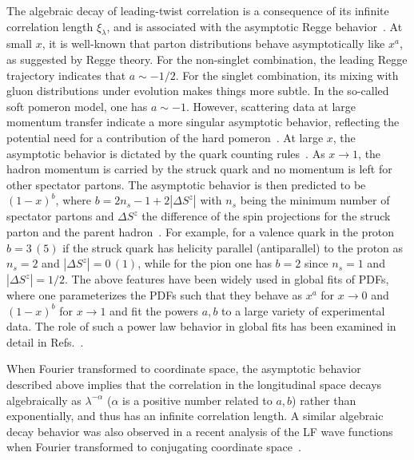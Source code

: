 \documentclass[preprint,12pt]{elsarticle}
\begin{document}
The algebraic decay of leading-twist correlation is a consequence of its infinite correlation length $\xi_\lambda$, and is associated with the asymptotic Regge behavior~\cite{Regge:1959mz}. At small $x$, it is well-known that parton distributions behave asymptotically like $x^a$, as suggested by Regge theory. For the non-singlet combination, the leading Regge trajectory indicates that $a\sim-1/2$. For the singlet combination, its mixing with gluon distributions under evolution makes things more subtle. In the so-called soft pomeron model, one has $a\sim -1$. However, scattering data at large momentum transfer indicate a more singular asymptotic behavior, reflecting the potential need for a contribution of the hard pomeron~\cite{Devenish:2004pb}. At large $x$, the asymptotic behavior is dictated by the quark counting rules~\cite{Brodsky:1973kr}. As $x\to 1$, the hadron momentum is carried by the struck quark and no momentum is left for other spectator partons. The asymptotic behavior is then predicted to be $(1-x)^b$, where $b=2n_s-1+2|\Delta S^z|$ with $n_s$ being the minimum number of spectator partons and $\Delta S^z$ the difference of the spin projections for the struck parton and the parent hadron~\cite{Devenish:2004pb,Brodsky:2005wx}. For example, for a valence quark in the proton $b=3\, (5)$ if the struck quark has helicity parallel (antiparallel) to the proton as $n_s=2$ and $|\Delta S^z|= 0\, (1)$, while for the pion one has $b=2$ since $n_s=1$ and $|\Delta S^z|=1/2$. The above features have been widely used in global fits of PDFs, where one parameterizes the PDFs such that they behave as $x^a$ for $x\to 0$ and $(1-x)^b$ for $x\to 1$ and fit the powers $a, b$ to a large variety of experimental data.
The role of such a power law behavior in global fits has been examined in detail in Refs.~\cite{Ball:2016spl,Nocera:2014uea}.

When Fourier transformed to coordinate space, the asymptotic behavior described above implies that the correlation in the longitudinal space decays algebraically as $\lambda^{-\alpha}$ ($\alpha$ is a positive number related to $a, b$) rather than exponentially, and thus has an infinite correlation length. A similar algebraic decay behavior was also observed in a recent analysis of the LF wave functions~\cite{Brodsky:1997de} when Fourier transformed to conjugating coordinate space~\cite{Miller:2019ysh}.
\end{document}
